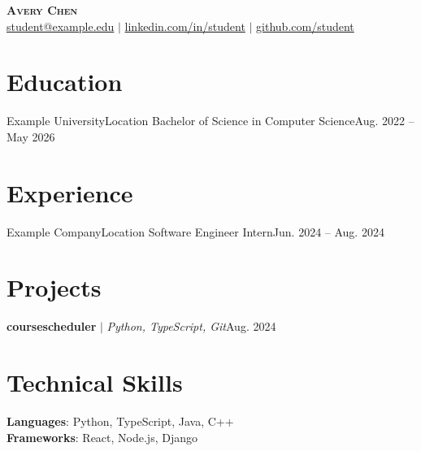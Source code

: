 \documentclass[letterpaper,11pt]{article}
\begin{document}
\begin{center}
    \textbf{\Huge \scshape Avery Chen} \\ \small
    \href{mailto:student@example.edu}{student@example.edu} $|$ 
    \href{https://linkedin.com/in/student}{linkedin.com/in/student} $|$
    \href{https://github.com/student}{github.com/student}
\end{center}

\section{Education}
  \resumeSubHeadingListStart
    \resumeSubheading
      {Example University}{Location}
      {Bachelor of Science in Computer Science}{Aug. 2022 -- May 2026}
  \resumeSubHeadingListEnd

\section{Experience}
  \resumeSubHeadingListStart
    \resumeSubheading
      {Example Company}{Location}
      {Software Engineer Intern}{Jun. 2024 -- Aug. 2024}
      \resumeItemListStart
      \resumeItemListEnd
  \resumeSubHeadingListEnd

\section{Projects}
  \resumeSubHeadingListStart
    \resumeProjectHeading
      {\textbf{coursescheduler} $|$ \emph{Python, TypeScript, Git}}{Aug. 2024}
      \resumeItemListStart
      \resumeItemListEnd
  \resumeSubHeadingListEnd

\section{Technical Skills}
 \begin{itemize}[leftmargin=0.15in, label={}]
    \small{\item{
     \textbf{Languages}{: Python, TypeScript, Java, C++} \\
     \textbf{Frameworks}{: React, Node.js, Django}
    }}
 \end{itemize}
\end{document}
